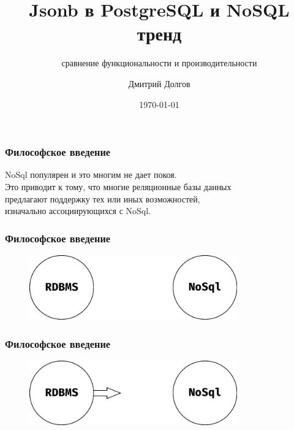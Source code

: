 \documentclass[14pt, compress, aspectratio=169]{beamer}
\title{Jsonb в PostgreSQL и NoSQL тренд}
\subtitle{сравнение функциональности и производительности}
\date{\today}
\author{Дмитрий Долгов}
\institute{}
\begin{document}
\maketitle

\section{}

\begin{frame}[fragile]
    \frametitle{Философское введение}
    NoSql популярен и это многим не дает покоя.\\
    Это приводит к тому, что многие реляционные базы данных\\
    предлагают поддержку тех или иных возможностей,\\
    изначально ассоциирующихся с NoSql.
\end{frame}

\begin{frame}[fragile]
    \frametitle{Философское введение}
    \vspace{-35pt}
    \begin{figure}
        \includegraphics[width=0.8\textwidth,center]{rdbms_nosql_1.png}
    \end{figure}
\end{frame}

\begin{frame}[fragile]
    \frametitle{Философское введение}
    \vspace{-35pt}
    \begin{figure}
        \includegraphics[width=0.8\textwidth,center]{rdbms_nosql_2.png}
    \end{figure}
\end{frame}
\end{document}
